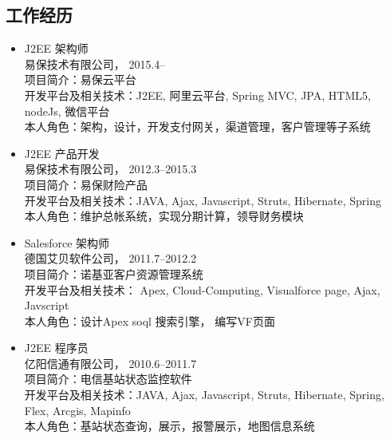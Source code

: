 \documentclass{res}
\begin{document}
\begin{CJK}{UTF8}{song}
\begin{resume}
    \section{工作经历}
    \begin{itemize}
    \item{ J2EE 架构师}\\
      { 易保技术有限公司}， \hfill 2015.4--\\
      项目简介：易保云平台\\
      开发平台及相关技术：J2EE, 阿里云平台, Spring MVC, JPA, HTML5, nodeJs, 微信平台\\
      本人角色：架构，设计，开发支付网关，渠道管理，客户管理等子系统\\
    \item{ J2EE 产品开发}\\
      { 易保技术有限公司}， \hfill 2012.3--2015.3\\
      项目简介：易保财险产品\\
      开发平台及相关技术：JAVA, Ajax, Javascript, Struts, Hibernate, Spring\\
      本人角色：维护总帐系统，实现分期计算，领导财务模块\\
    \item{ Salesforce 架构师}\\
      { 德国艾贝软件公司}， \hfill 2011.7--2012.2\\
      项目简介：诺基亚客户资源管理系统\\
      开发平台及相关技术： Apex, Cloud-Computing, Visualforce page, Ajax, Javscript\\
      本人角色：设计Apex soql 搜索引擎， 编写VF页面\\
    \item{ J2EE 程序员}\\
      { 亿阳信通有限公司}， \hfill 2010.6--2011.7\\
      项目简介：电信基站状态监控软件\\
      开发平台及相关技术：JAVA, Ajax, Javascript, Struts, Hibernate, Spring, Flex, Arcgis, Mapinfo\\
      本人角色：基站状态查询，展示，报警展示，地图信息系统\\

\end{itemize}
\end{resume}
\end{CJK}
\end{document}
